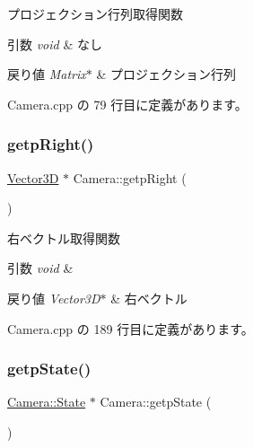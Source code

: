 プロジェクション行列取得関数 


\begin{DoxyParams}{引数}
{\em void} & なし \\
\hline
\end{DoxyParams}

\begin{DoxyRetVals}{戻り値}
{\em Matrix$\ast$} & プロジェクション行列 \\
\hline
\end{DoxyRetVals}


 Camera.\+cpp の 79 行目に定義があります。

\mbox{\label{class_camera_a4598846e26db6cf3fe4a661b8e6a1917}} 
\subsubsection{\texorpdfstring{getp\+Right()}{getpRight()}}
{\footnotesize\ttfamily \mbox{\hyperlink{class_vector3_d}{Vector3D}} $\ast$ Camera\+::getp\+Right (\begin{DoxyParamCaption}{ }\end{DoxyParamCaption})}



右ベクトル取得関数 


\begin{DoxyParams}{引数}
{\em void} & \\
\hline
\end{DoxyParams}

\begin{DoxyRetVals}{戻り値}
{\em Vector3\+D$\ast$} & 右ベクトル \\
\hline
\end{DoxyRetVals}


 Camera.\+cpp の 189 行目に定義があります。

\mbox{\label{class_camera_af6c2d92a8119d8379ee8f421a04e1a0c}} 
\subsubsection{\texorpdfstring{getp\+State()}{getpState()}}
{\footnotesize\ttfamily \mbox{\hyperlink{class_camera_1_1_state}{Camera\+::\+State}} $\ast$ Camera\+::getp\+State (\begin{DoxyParamCaption}{ }\end{DoxyParamCaption})}



